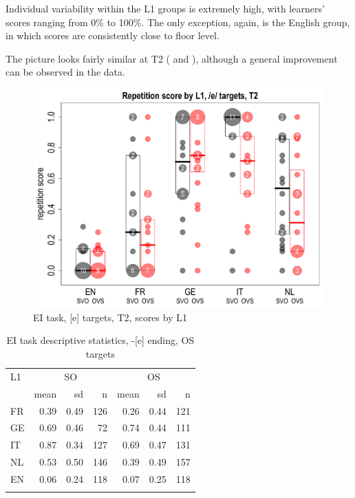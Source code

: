 Individual variability within the L1 groups is extremely high, with learners’ scores ranging from 0\% to 100\%. The only exception, again, is the English group, in which scores are consistently close to floor level.

The picture looks fairly similar at T2 ( and ), although a general improvement can be observed in the data.

\begin{figure}
    \includegraphics[width=\textwidth]{figures/04-2.pdf}
    \caption{EI task, [e] targets, T2, scores by L1}
    \label{fig:04:2}
\end{figure}

\begin{table}
    \begin{tabular}{lrrr rrr}
    \lsptoprule
    L1 & \multicolumn{3}{c}{ SO} & \multicolumn{3}{c}{ OS}\\
    & mean & sd & n & mean & sd & n\\
    \cmidrule(r){2-4}\cmidrule(l){5-7}
    FR & 0.39 & 0.49 & 126 & 0.26 & 0.44 & 121\\
    GE & 0.69 & 0.46 & 72 & 0.74 & 0.44 & 111\\
    IT & 0.87 & 0.34 & 127 & 0.69 & 0.47 & 131\\
    NL & 0.53 & 0.50 & 146 & 0.39 & 0.49 & 157\\
    EN & 0.06 & 0.24 & 118 & 0.07 & 0.25 & 118\\
    \lspbottomrule
    \end{tabular}
    \caption{EI task descriptive statistics, -[e] ending, OS targets}
    \label{tab:04:2}
    \label{tab:03:2}
\end{table}

